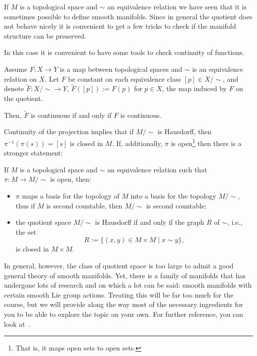 If $M$ is a topological space and $\sim$ an equivalence relation we have seen that it is sometimes possible to define smooth manifolds.
Since in general the quotient does not behave nicely it is convenient to get a few tricks to check if the manifold structure can be preserved.

In this case it is convenient to have some tools to check continuity of functions.

\begin{proposition}
  Assume $F:X\to Y$ is a map between topological spaces and $\sim$ is an equivalence relation on $X$.
  Let $F$ be constant on each equivalence class $[p]\in X/\!\sim$, and denote $\widetilde F:X/\!\sim\to Y$, $\widetilde F([p]) := F(p)$ for $p\in X$, the map induced by $F$ on the quotient.

  Then, $\widetilde F$ is continuous if and only if $F$ is continuous.
\end{proposition}

Continuity of the projection implies that if $M/\!\sim$ is Hausdorff, then $\pi^{-1}(\pi(s)) = [s]$ is closed in $M$.
If, additionally, $\pi$ is open\footnote{That is, it maps open sets to open sets.} then there is a stronger statement:
\begin{theorem}\label{thm:openproj}
  If $M$ is a topological space and $\sim$ an equivalence relation such that $\pi:M \to M/\!\sim$ is open, then:
  \begin{itemize}
    \item $\pi$ maps a basis for the topology of $M$ into a basis for the topology $M/\!\sim$, thus if $M$ is second countable, then $M/\!\sim$ is second countable;
    \item the quotient space $M/\!\sim$ is Hausdorff if and only if the graph $R$ of $\sim$, i.e., the set
    \begin{equation}
      R := \{(x,y)\in M\times M \mid x\sim y\},
    \end{equation}
    is closed in $M\times M$.
  \end{itemize}
\end{theorem}

In general, however, the class of quotient space is too large to admit a good general theory of smooth manifolds.
Yet, there is a family of manifolds that has undergone lots of research and on which a lot can be said: smooth manifolds with certain smooth Lie group actions.
Treating this will be far too much for the course, but we will provide along the way most of the necessary ingredients for you to be able to explore the topic on your own.
For further reference, you can look at~\cite[Chapter 21]{book:lee}.

